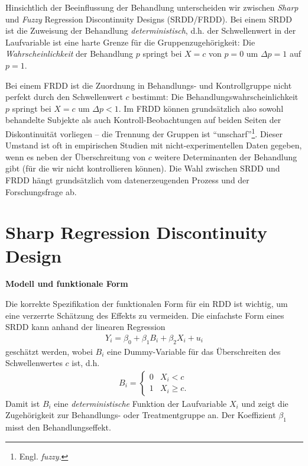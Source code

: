 \documentclass[
  a4paper,
  DIV=11,
  oneside]{scrreprt}
\begin{document}
Hinsichtlich der Beeinflussung der Behandlung unterscheiden wir zwischen
\emph{Sharp} und \emph{Fuzzy} Regression Discontinuity Designs
(SRDD/FRDD). Bei einem SRDD ist die Zuweisung der Behandlung
\emph{deterministisch}, d.h. der Schwellenwert in der Laufvariable ist
eine harte Grenze für die Gruppenzugehörigkeit: Die
\emph{Wahrscheinlichkeit} der Behandlung \(p\) springt bei \(X=c\) von
\(p=0\) um \(\Delta p = 1\) auf \(p=1\).

Bei einem FRDD ist die Zuordnung in Behandlungs- und Kontrollgruppe
nicht perfekt durch den Schwellenwert \(c\) bestimmt: Die
Behandlungswahrscheinlichkeit \(p\) springt bei \(X=c\) um
\(\Delta p<1\). Im FRDD können grundsätzlich also sowohl behandelte
Subjekte als auch Kontroll-Beobachtungen auf beiden Seiten der
Diskontinuität vorliegen -- die Trennung der Gruppen ist
``unscharf''\footnote{Engl. \emph{fuzzy}.}. Dieser Umstand ist oft in
empirischen Studien mit nicht-experimentellen Daten gegeben, wenn es
neben der Überschreitung von \(c\) weitere Determinanten der Behandlung
gibt (für die wir nicht kontrollieren können). Die Wahl zwischen SRDD
und FRDD hängt grundsätzlich vom datenerzeugenden Prozess und der
Forschungsfrage ab.

\hypertarget{sharp-regression-discontinuity-design}{%
\section{Sharp Regression Discontinuity
Design}\label{sharp-regression-discontinuity-design}}

\textbf{Modell und funktionale Form}

Die korrekte Spezifikation der funktionalen Form für ein RDD ist
wichtig, um eine verzerrte Schätzung des Effekts zu vermeiden. Die
einfachste Form eines SRDD kann anhand der linearen Regression
\begin{align}
Y_i = \beta_0 + \beta_1 B_i + \beta_2 X_i + u_i\label{eq-simpleSRDD}
\end{align} geschätzt werden, wobei \(B_i\) eine Dummy-Variable für das
Überschreiten des Schwellenwertes \(c\) ist, d.h. \begin{align*}
  B_i=\begin{cases}
    0 & X_i < c\\
    1 & X_i \geq c.
  \end{cases}
\end{align*} Damit ist \(B_i\) eine \emph{deterministische} Funktion der
Laufvariable \(X_i\) und zeigt die Zugehörigkeit zur Behandlungs- oder
Treatmentgruppe an. Der Koeffizient \(\beta_1\) misst den
Behandlungseffekt.
\end{document}
